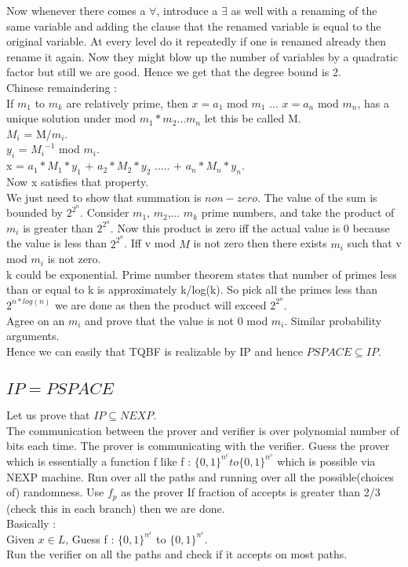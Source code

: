 \documentclass[solution,addpoints,12pt]{exam}
\begin{document}
Now whenever there comes a $\forall$, introduce
a $\exists$ as well with a renaming of the same variable
and adding the clause that the renamed variable is equal to
the original variable. At every level do it repeatedly
if one is renamed already then rename it again. Now they might
blow up the number of variables by a quadratic factor but still
we are good. Hence we get that the degree bound is 2.\\

Chinese remaindering :\\
If $m_1$ to $m_k$ are relatively prime, then
$x = a_1$ mod $m_1$ ... $x = a_n$ mod $m_n$,
has a unique solution under mod $m_1*m_2...m_n$ let this be called M.\\
$M_i$ = M/$m_i$.\\
$y_i$ = ${M_i}^{-1}$ mod $m_i$.\\
x = $a_1*M_1*y_1$ + $a_2*M_2*y_2$ ..... + $a_n*M_n*y_n$.\\
Now x satisfies that property.\\
We just need to show that summation is $non-zero$. The value
of the sum is bounded by $2^{2^n}$. Consider $m_1$, $m_2$,...
$m_k$ prime numbers, and take the product of $m_i$ is greater than
$2^{2^n}$. Now this product is zero iff the actual value is 0
because the value is less than $2^{2^n}$. Iff v mod $M$ is
not zero then there exists $m_i$ such that v mod $m_i$ is not
zero.\\
k could be exponential. Prime number theorem states
that number of primes less than or equal to k
is approximately k/log(k). So pick
all the primes less than $2^{n*log(n)}$ we are done as then the
product will exceed $2^{2^n}$.\\
Agree on an $m_i$ and prove that the value is not 0 mod $m_i$.
Similar probability arguments.\\

Hence we can easily that TQBF is realizable by IP and
hence $PSPACE \subseteq IP$.

\subsection{$IP = PSPACE$}
Let us prove that $IP \subseteq NEXP$.\\
The communication between the prover and verifier
is over polynomial number of bits each time.
The prover is communicating with the verifier. Guess
the prover which is essentially a function f
like f : ${\{0, 1\}}^{n^c} to {\{0, 1\}}^{n^c}$ which
is possible via NEXP machine. Run over all the
paths and running over all the
possible(choices of) randomness. Use $f_p$ as the prover
If fraction of accepts is greater than 2/3 (check this in
each branch) then we are done.\\
Basically :\\
Given $x \in L$, Guess f : ${\{0, 1\}}^{n^c}$ to ${\{0, 1\}}^{n^c}$.\\
Run the verifier on all the paths and check if it accepts on most paths.\\
\end{document}

